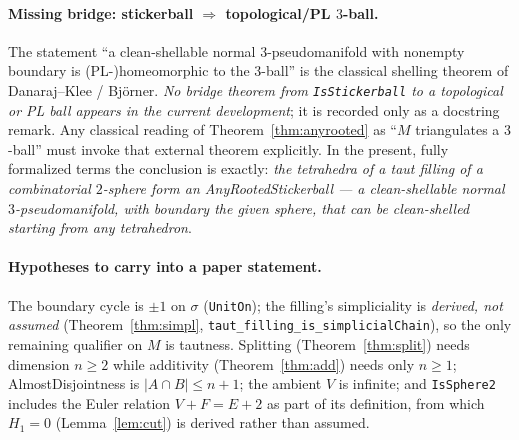 \documentclass[11pt]{article}
\theoremstyle{plain}
\theoremstyle{definition}
\theoremstyle{remark}
\newcommand{\code}[1]{\texttt{#1}}
\newcommand{\card}[1]{\lvert #1\rvert}
\begin{document}
\paragraph{Missing bridge: stickerball $\Rightarrow$ topological/PL $3$-ball.}
The statement ``a clean-shellable normal $3$-pseudomanifold with nonempty boundary is
(PL-)homeomorphic to the $3$-ball'' is the classical shelling theorem of Danaraj--Klee /
Bj\"orner. \emph{No bridge theorem from \code{IsStickerball} to a topological or PL ball
appears in the current development}; it is recorded only as a docstring remark. Any classical
reading of Theorem~\ref{thm:anyrooted} as ``$M$ triangulates a $3$-ball'' must invoke that
external theorem explicitly. In the present, fully formalized terms the conclusion is exactly:
\emph{the tetrahedra of a taut filling of a combinatorial $2$-sphere form an
AnyRootedStickerball --- a clean-shellable normal $3$-pseudomanifold, with boundary the given
sphere, that can be clean-shelled starting from any tetrahedron}.

\paragraph{Hypotheses to carry into a paper statement.}
The boundary cycle is $\pm1$ on $\sigma$ (\code{UnitOn}); the filling's simpliciality is
\emph{derived, not assumed} (Theorem~\ref{thm:simpl}, \code{taut\_filling\_is\_simplicialChain}),
so the only remaining qualifier on $M$ is tautness. Splitting (Theorem~\ref{thm:split}) needs
dimension $n\ge 2$ while additivity (Theorem~\ref{thm:add}) needs only $n\ge 1$;
AlmostDisjointness is
$\card{A\cap B}\le n+1$; the ambient $V$ is infinite; and \code{IsSphere2} includes the Euler
relation $V+F=E+2$ as part of its definition, from which $H_1=0$ (Lemma~\ref{lem:cut}) is
derived rather than assumed.
\end{document}

